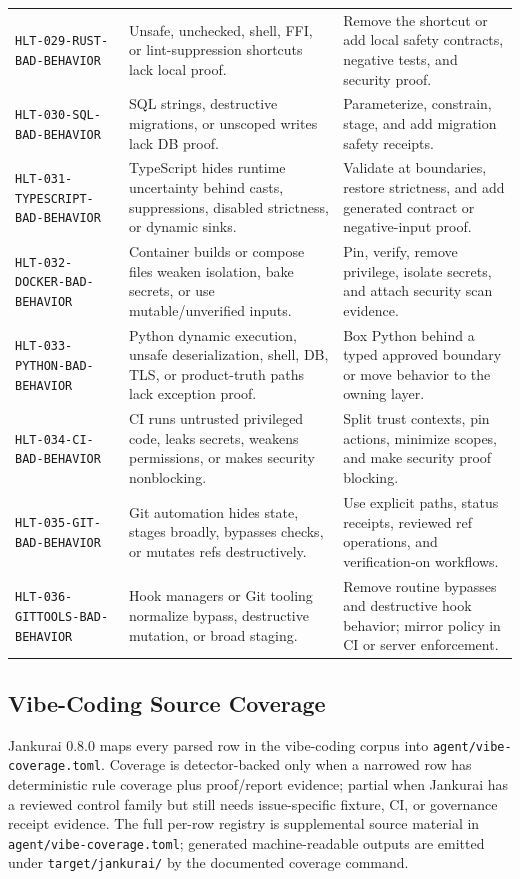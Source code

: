 \begin{table}[t]
\begin{tabularx}{\textwidth}{L{0.28\textwidth} Y Y}
\texttt{HLT-029-RUST-BAD-BEHAVIOR} & Unsafe, unchecked, shell, FFI, or lint-suppression shortcuts lack local proof. & Remove the shortcut or add local safety contracts, negative tests, and security proof. \\
\texttt{HLT-030-SQL-BAD-BEHAVIOR} & SQL strings, destructive migrations, or unscoped writes lack DB proof. & Parameterize, constrain, stage, and add migration safety receipts. \\
\texttt{HLT-031-TYPESCRIPT-BAD-BEHAVIOR} & TypeScript hides runtime uncertainty behind casts, suppressions, disabled strictness, or dynamic sinks. & Validate at boundaries, restore strictness, and add generated contract or negative-input proof. \\
\texttt{HLT-032-DOCKER-BAD-BEHAVIOR} & Container builds or compose files weaken isolation, bake secrets, or use mutable/unverified inputs. & Pin, verify, remove privilege, isolate secrets, and attach security scan evidence. \\
\texttt{HLT-033-PYTHON-BAD-BEHAVIOR} & Python dynamic execution, unsafe deserialization, shell, DB, TLS, or product-truth paths lack exception proof. & Box Python behind a typed approved boundary or move behavior to the owning layer. \\
\texttt{HLT-034-CI-BAD-BEHAVIOR} & CI runs untrusted privileged code, leaks secrets, weakens permissions, or makes security nonblocking. & Split trust contexts, pin actions, minimize scopes, and make security proof blocking. \\
\texttt{HLT-035-GIT-BAD-BEHAVIOR} & Git automation hides state, stages broadly, bypasses checks, or mutates refs destructively. & Use explicit paths, status receipts, reviewed ref operations, and verification-on workflows. \\
\texttt{HLT-036-GITTOOLS-BAD-BEHAVIOR} & Hook managers or Git tooling normalize bypass, destructive mutation, or broad staging. & Remove routine bypasses and destructive hook behavior; mirror policy in CI or server enforcement. \\
\bottomrule
\end{tabularx}
\end{table}

\subsection{Vibe-Coding Source Coverage}

Jankurai 0.8.0 maps every parsed row in the vibe-coding corpus into
\texttt{agent/vibe-coverage.toml}. Coverage is
detector-backed only when a narrowed row has deterministic rule coverage plus
proof/report evidence; partial when Jankurai has a reviewed control family but
still needs issue-specific fixture, CI, or governance receipt evidence. The full
per-row registry is supplemental source material in
\texttt{agent/vibe-coverage.toml}; generated machine-readable outputs are
emitted under \texttt{target/jankurai/} by the documented coverage command.

